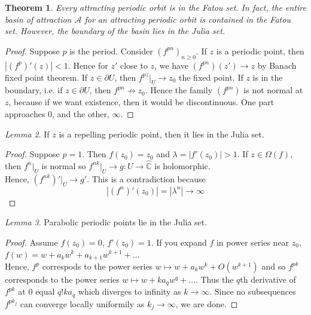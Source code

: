 \documentclass[a4paper, 11pt]{book}
\newtheorem{theorem}{Theorem}
\theoremstyle{definition}
\theoremstyle{remark}
\newtheorem{lemma}[theorem]{Lemma}
\begin{document}
    \begin{theorem}
        Every attracting periodic orbit is in the Fatou set. In fact, the entire basin of attraction
        $\mathcal{A}$ for an attracting periodic orbit is contained in the Fatou set. However, the boundary of the
        basin lies in the Julia set.
    \end{theorem}

    \begin{proof}
        Suppose $p$ is the period. Consider $(f^{pn})_{n\geq 0}$. If $z$ is a periodic point, then $|(f^p)'(z)|<1$. Hence
        for $z'$ close to $z$, we have $(f^{pn})(z')\to z$ by Banach fixed point theorem.
        If $z\in\partial{U}$, then $f^{pz}|_U\to z_0$ the fixed point. If $z$ is in the boundary, i.e. if $z\in\partial{U}$, then
        $f^{pn}\not\to z_0$. Hence the family $(f^{pn})$ is not normal at $z$, because if we want existence, then it would be
        discontinuous. One part approaches 0, and the other, $\infty$.
    \end{proof}

    \begin{lemma}
        If $z$ is a repelling periodic point, then it lies in the Julia set.
    \end{lemma}
    \begin{proof}
        Suppose $p = 1$. Then $f(z_0) = z_0$ and $\lambda = |f'(z_0)| > 1$. If $z\in\Omega(f)$, then $f^n|_U$ is normal so 
        $f^{nk}|_U \to g: U \to \hat{\mathbb{C}}$ is holomorphic.\\
        Hence, $(f^{nk})'|_U \to g'$. This is a contradiction because
        \[ |(f^n)'(z_0)| = |\lambda^n| \to \infty \]
    \end{proof}

    \begin{lemma}
        Parabolic periodic points lie in the Julia set.
    \end{lemma}
    \begin{proof}
        Assume $f(z_0) = 0$, $f'(z_0) = 1$. If you expand $f$ in power series near $z_0$, $f(w) = w + a_kw^k + a_{k+1}w^{k+1}+\hdots$\\
        Hence, $f^p$ correspods to the power series $w\mapsto w+a_kw^k + O(w^{k+1})$ and so $f^{pk}$ corresponds to the power
        series $w \mapsto w + ka_qw^q + \hdots$. Thus the $q$th derivative of $f^{pk}$ at 0 equal $q!ka_q$ which diverges to infinity as
        $k\to\infty$. Since no subsequences $f^{pk_j}$ can converge locally uniformily as $k_j\to\infty$, we are done.
    \end{proof}
\end{document}
